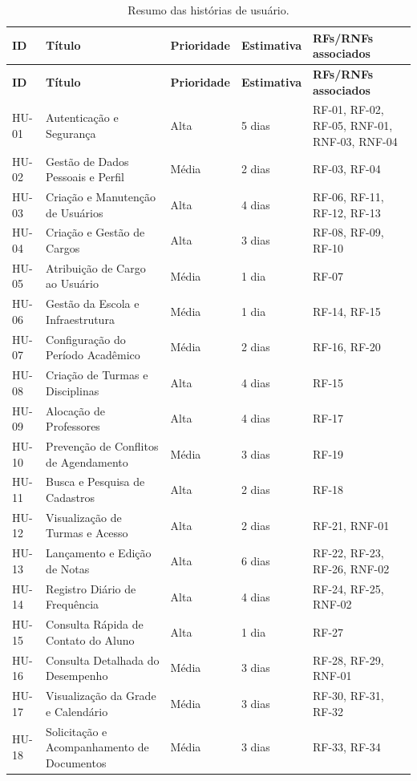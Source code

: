 \begin{xltabular}{\textwidth}{p{0.07\textwidth} p{0.25\textwidth} p{0.14\textwidth} p{0.14\textwidth} X}
\caption{Resumo das histórias de usuário.}\label{tab:hu-resumo}\\
\toprule
\textbf{ID} & \textbf{Título} & \textbf{Prioridade} & \textbf{Estimativa} & \textbf{RFs/RNFs associados} \\
\midrule
\endfirsthead
\toprule
\textbf{ID} & \textbf{Título} & \textbf{Prioridade} & \textbf{Estimativa} & \textbf{RFs/RNFs associados} \\
\midrule
\endhead
\bottomrule
\endlastfoot
HU-01 & Autenticação e Segurança & Alta & 5 dias & RF-01, RF-02, RF-05, RNF-01, RNF-03, RNF-04 \\
HU-02 & Gestão de Dados Pessoais e Perfil & Média & 2 dias & RF-03, RF-04 \\
HU-03 & Criação e Manutenção de Usuários & Alta & 4 dias & RF-06, RF-11, RF-12, RF-13 \\
HU-04 & Criação e Gestão de Cargos & Alta & 3 dias & RF-08, RF-09, RF-10 \\
HU-05 & Atribuição de Cargo ao Usuário & Média & 1 dia & RF-07 \\
HU-06 & Gestão da Escola e Infraestrutura & Média & 1 dia & RF-14, RF-15 \\
HU-07 & Configuração do Período Acadêmico & Média & 2 dias & RF-16, RF-20 \\
HU-08 & Criação de Turmas e Disciplinas & Alta & 4 dias & RF-15 \\
HU-09 & Alocação de Professores & Alta & 4 dias & RF-17 \\
HU-10 & Prevenção de Conflitos de Agendamento & Média & 3 dias & RF-19 \\
HU-11 & Busca e Pesquisa de Cadastros & Alta & 2 dias & RF-18 \\
HU-12 & Visualização de Turmas e Acesso & Alta & 2 dias & RF-21, RNF-01 \\
HU-13 & Lançamento e Edição de Notas & Alta & 6 dias & RF-22, RF-23, RF-26, RNF-02 \\
HU-14 & Registro Diário de Frequência & Alta & 4 dias & RF-24, RF-25, RNF-02 \\
HU-15 & Consulta Rápida de Contato do Aluno & Alta & 1 dia & RF-27 \\
HU-16 & Consulta Detalhada do Desempenho & Média & 3 dias & RF-28, RF-29, RNF-01 \\
HU-17 & Visualização da Grade e Calendário & Média & 3 dias & RF-30, RF-31, RF-32 \\
HU-18 & Solicitação e Acompanhamento de Documentos & Média & 3 dias & RF-33, RF-34 \\
\end{xltabular}

